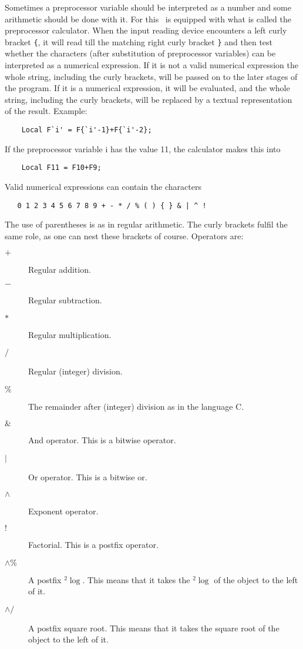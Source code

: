 Sometimes a preprocessor variable 
should be interpreted as a number and some arithmetic 
should be done with it. For this \FORM\ is equipped with what is called the 
preprocessor calculator. When the input reading device 
encounters a left curly bracket 
\verb:{:, it will read till the matching right curly bracket \verb:}: and 
then test whether the characters (after substitution of preprocessor 
variables) can be interpreted as a numerical expression. If it is not a 
valid numerical expression the whole string, including the curly brackets, 
will be passed on to the later stages of the program. If it is a numerical 
expression, it will be evaluated, and the whole string, including the curly 
brackets, will be replaced by a textual representation of the result. 
Example:
\begin{verbatim}
    Local F`i' = F{`i'-1}+F{`i'-2};
\end{verbatim}
If the preprocessor variable i has the value 11, the calculator makes this 
into
\begin{verbatim}
    Local F11 = F10+F9;
\end{verbatim}
Valid numerical expressions can contain the characters
\begin{verbatim}
   0 1 2 3 4 5 6 7 8 9 + - * / % ( ) { } & | ^ !
\end{verbatim}
The use of parentheses is as in regular arithmetic. The curly 
brackets fulfil the same role, as one can nest these brackets of course. 
Operators are:
\begin{description}
\item[$+$] Regular addition.
\item[$-$] Regular subtraction.
\item[$\ast$] Regular multiplication.
\item[$/$] Regular (integer) division.
\item[$\%$] The remainder after (integer) division as in 
the language C.
\item[$\&$] And operator. This is a bitwise operator.
\item[$|$] Or operator. This is a bitwise or.
\item[$\wedge$] Exponent operator.
\item[$!$] Factorial. This is a postfix operator.
\item[$\wedge\%$] A postfix ${}^2\!\log$. This means that it 
takes the ${}^2\!\log$ of the object to the left of it.
\item[$\wedge/$] A postfix square root. This means that 
it takes the square root of the object to the left of it.
\end{description}
